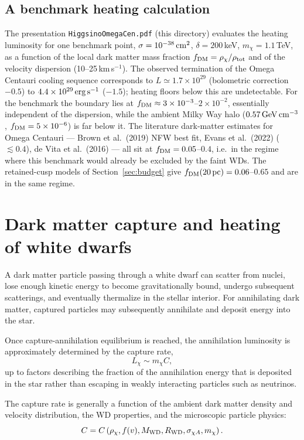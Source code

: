 \documentclass[11pt,a4paper]{article}
\begin{document}
\subsection{A benchmark heating calculation}
The presentation \texttt{HiggsinoOmegaCen.pdf} (this directory) evaluates the heating luminosity for one benchmark point, $\sigma=10^{-38}\,{\rm cm^{2}}$, $\delta=200$\,keV, $m_\chi=1.1$\,TeV, as a function of the local dark matter mass fraction $f_{\rm DM}=\rho_\chi/\rho_{\rm tot}$ and of the velocity dispersion (10--25\,km\,s$^{-1}$). The observed termination of the Omega Centauri cooling sequence corresponds to $L\simeq1.7\times10^{29}$ (bolometric correction $-0.5$) to $4.4\times10^{29}\,{\rm erg\,s^{-1}}$ ($-1.5$); heating floors below this are undetectable. For the benchmark the boundary lies at $f_{\rm DM}\approx3\times10^{-3}$--$2\times10^{-2}$, essentially independent of the dispersion, while the ambient Milky Way halo ($0.57\,{\rm GeV\,cm^{-3}}$, $f_{\rm DM}=5\times10^{-6}$) is far below it. The literature dark-matter estimates for Omega Centauri --- Brown et al.\ (2019) NFW best fit, Evans et al.\ (2022) ($\lesssim0.4$), de Vita et al.\ (2016) --- all sit at $f_{\rm DM}=0.05$--$0.4$, i.e.\ in the regime where this benchmark would already be excluded by the faint WDs. The retained-cusp models of Section~\ref{sec:budget} give $f_{\rm DM}(20\,{\rm pc})=0.06$--$0.65$ and are in the same regime.

\section{Dark matter capture and heating of white dwarfs}

A dark matter particle passing through a white dwarf can scatter from nuclei, lose enough kinetic energy to become gravitationally bound, undergo subsequent scatterings, and eventually thermalize in the stellar interior. For annihilating dark matter, captured particles may subsequently annihilate and deposit energy into the star.

Once capture-annihilation equilibrium is reached, the annihilation luminosity is approximately determined by the capture rate,
\begin{equation}
L_\chi \sim m_\chi C,
\end{equation}
up to factors describing the fraction of the annihilation energy that is deposited in the star rather than escaping in weakly interacting particles such as neutrinos.

The capture rate is generally a function of the ambient dark matter density and velocity distribution, the WD properties, and the microscopic particle physics:
\begin{equation}
C =
C\left(
\rho_\chi,
f(v),
M_{\rm WD},
R_{\rm WD},
\sigma_{\chi A},
m_\chi
\right).
\end{equation}
\end{document}
